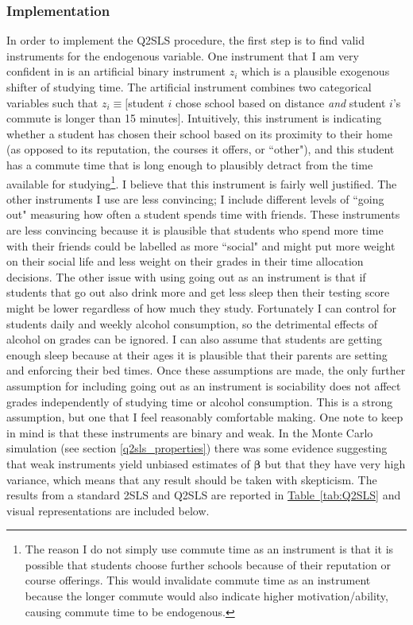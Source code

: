 \documentclass[12pt]{article}
\begin{document}
\subsubsection{Implementation}
In order to implement the Q2SLS procedure, the first step is to find valid instruments for the endogenous variable. One instrument that I am very confident in is an artificial binary instrument $z_i$ which is a plausible exogenous shifter of studying time. The artificial instrument combines two categorical variables such that $z_i \equiv \mathbb[$student $i$ chose school based on distance \textit{and} student $i$'s commute is longer than 15 minutes$]$. Intuitively, this instrument is indicating whether a student has chosen their school based on its proximity to their home (as opposed to its reputation, the courses it offers, or ``other"), and this student has a commute time that is long enough to plausibly detract from the time available for studying\footnote{The reason I do not simply use commute time as an instrument is that it is possible that students choose further schools because of their reputation or course offerings. This would invalidate commute time as an instrument because the longer commute would also indicate higher motivation/ability, causing commute time to be endogenous.}. I believe that this instrument is fairly well justified. The other instruments I use are less convincing; I include different levels of ``going out" measuring how often a student spends time with friends. These instruments are less convincing because it is plausible that students who spend more time with their friends could be labelled as more ``social" and might put more weight on their social life and less weight on their grades in their time allocation decisions. The other issue with using going out as an instrument is that if students that go out also drink more and get less sleep then their testing score might be lower regardless of how much they study. Fortunately I can control for students daily and weekly alcohol consumption, so the detrimental effects of alcohol on grades can be ignored. I can also assume that students are getting enough sleep because at their ages it is plausible that their parents are setting and enforcing their bed times. Once these assumptions are made, the only further assumption for including going out as an instrument is sociability does not affect grades independently of studying time or alcohol consumption. This is a strong assumption, but one that I feel reasonably comfortable making. One note to keep in mind is that these instruments are binary and weak. In the Monte Carlo simulation (see section \ref{q2sls_properties}) there was some evidence suggesting that weak instruments yield unbiased estimates of $\bm{\beta}$ but that they have very high variance, which means that any result should be taken with skepticism. The results from a standard 2SLS and Q2SLS are reported in \hyperref[tab:Q2SLS]{Table~\ref*{tab:Q2SLS}} and visual representations are included below.
\end{document}

